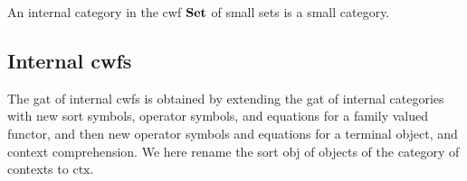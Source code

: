 \documentclass{lmcs}
\newcommand{\FYI}[1]{{\color{red}#1}}
\def\Obj{\mathrm{obj}}
\def\Hom{\mathrm{hom}}
\def\id{\mathrm{id}}
\newcommand{\ctx}{\mathrm{ctx}}
\begin{document}
An internal category in the cwf ${\bf Set}$ of small sets is a small category.


\subsection{Internal cwfs}\label{gat-cwf}

The gat of internal cwfs is obtained by extending the gat of internal categories with new sort symbols, operator symbols, and equations for a family valued functor, and then new operator symbols and equations for a terminal object, and context comprehension. We here rename the sort $\Obj$ of objects of the category of contexts to $\ctx$.
\end{document}
